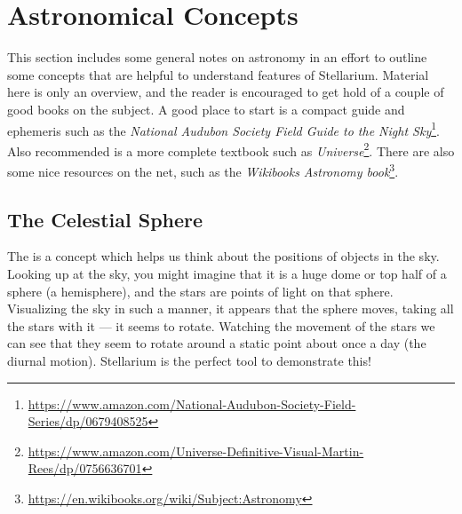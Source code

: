 
\chapter{Astronomical Concepts}
\label{ch:Concepts}

This section includes some general notes on astronomy in an effort to
outline some concepts that are helpful to understand features of
Stellarium. Material here is only an overview, and the reader is
encouraged to get hold of a couple of good books on the subject. A
good place to start is a compact guide and ephemeris such as the
\emph{National Audubon Society Field Guide to the Night
  Sky}\footnote{\url{https://www.amazon.com/National-Audubon-Society-Field-Series/dp/0679408525}}. Also
recommended is a more complete textbook such as
\emph{Universe}\footnote{\url{https://www.amazon.com/Universe-Definitive-Visual-Martin-Rees/dp/0756636701}}.
There are also some nice resources on the net, such as the
\emph{Wikibooks Astronomy book}\footnote{\url{https://en.wikibooks.org/wiki/Subject:Astronomy}}.

\section{The Celestial Sphere}
\label{sec:Concepts:CelestialSphere}

The  is a concept which helps us think about the
positions of objects in the sky. Looking up at the sky, you might
imagine that it is a huge dome or top half of a sphere (a hemisphere), and the stars
are points of light on that sphere. Visualizing the sky in such a
manner, it appears that the sphere moves, taking all the stars with it
--- it seems to rotate. Watching the movement of the stars we can see
that they seem to rotate around a static point about once a day (the diurnal motion).
Stellarium is the perfect tool to demonstrate this!

